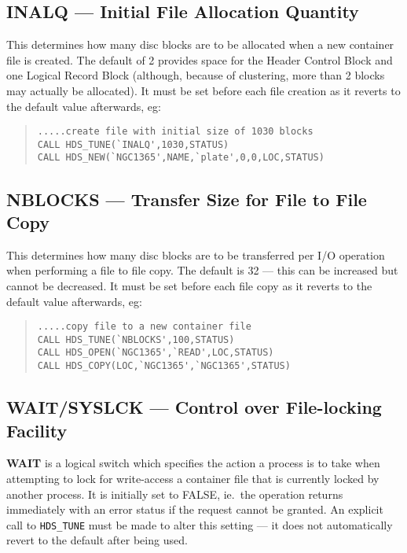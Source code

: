 \subsection {INALQ --- Initial File Allocation Quantity}

This determines how many disc blocks are to be allocated when a new container
file is created. The default of 2 provides space for the Header Control Block
and one Logical Record Block (although, because of clustering, more than 2
blocks may actually be allocated). It must be set before each file creation as
it reverts to the default value afterwards, eg:

\begin {quote}
\begin {verbatim}
.....create file with initial size of 1030 blocks
CALL HDS_TUNE(`INALQ',1030,STATUS)
CALL HDS_NEW(`NGC1365',NAME,`plate',0,0,LOC,STATUS)
\end{verbatim}
\end {quote}

\subsection {NBLOCKS --- Transfer Size for File to File Copy}

This determines how many disc blocks are to be transferred per I/O operation
when performing a file to file copy. The default is 32 --- this can be
increased but cannot be decreased. It must be set before each file copy as it
reverts to the default value afterwards, eg:

\begin {quote}
\begin {verbatim}
.....copy file to a new container file
CALL HDS_TUNE(`NBLOCKS',100,STATUS)
CALL HDS_OPEN(`NGC1365',`READ',LOC,STATUS)
CALL HDS_COPY(LOC,`NGC1365',`NGC1365',STATUS)
\end{verbatim}
\end {quote}

\subsection {WAIT/SYSLCK --- Control over File-locking Facility}

{\bf WAIT} is a logical switch which specifies the action a process is to take
when attempting to lock for write-access a container file that is currently
locked by another process. It is initially set to FALSE, ie.\ the operation
returns immediately with an error status if the request cannot be granted. An
explicit call to {\tt HDS\_TUNE} must be made to alter this setting --- it does
not automatically revert to the default after being used.

